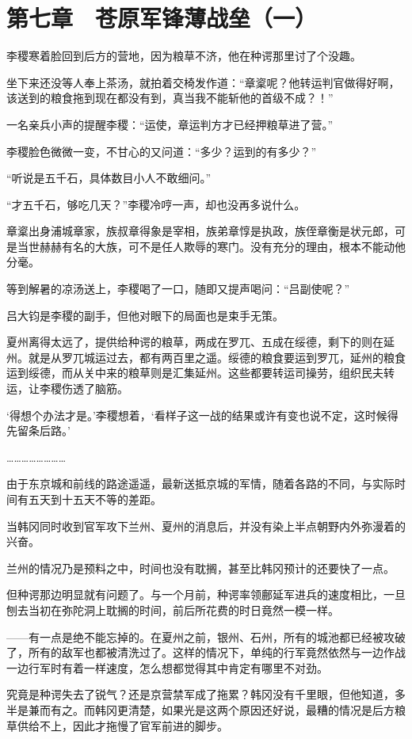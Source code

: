 \section{第七章　苍原军锋薄战垒（一）}

李稷寒着脸回到后方的营地，因为粮草不济，他在种谔那里讨了个没趣。

坐下来还没等人奉上茶汤，就拍着交椅发作道：“章楶呢？他转运判官做得好啊，该送到的粮食拖到现在都没有到，真当我不能斩他的首级不成？！”

一名亲兵小声的提醒李稷：“运使，章运判方才已经押粮草进了营。”

李稷脸色微微一变，不甘心的又问道：“多少？运到的有多少？”

“听说是五千石，具体数目小人不敢细问。”

“才五千石，够吃几天？”李稷冷哼一声，却也没再多说什么。

章楶出身浦城章家，族叔章得象是宰相，族弟章惇是执政，族侄章衡是状元郎，可是当世赫赫有名的大族，可不是任人欺辱的寒门。没有充分的理由，根本不能动他分毫。

等到解暑的凉汤送上，李稷喝了一口，随即又提声喝问：“吕副使呢？”

吕大钧是李稷的副手，但他对眼下的局面也是束手无策。

夏州离得太远了，提供给种谔的粮草，两成在罗兀、五成在绥德，剩下的则在延州。就是从罗兀城运过去，都有两百里之遥。绥德的粮食要运到罗兀，延州的粮食运到绥德，而从关中来的粮草则是汇集延州。这些都要转运司操劳，组织民夫转运，让李稷伤透了脑筋。

‘得想个办法才是。’李稷想着，‘看样子这一战的结果或许有变也说不定，这时候得先留条后路。’

……………………

由于东京城和前线的路途遥遥，最新送抵京城的军情，随着各路的不同，与实际时间有五天到十五天不等的差距。

当韩冈同时收到官军攻下兰州、夏州的消息后，并没有染上半点朝野内外弥漫着的兴奋。

兰州的情况乃是预料之中，时间也没有耽搁，甚至比韩冈预计的还要快了一点。

但种谔那边明显就有问题了。与一个月前，种谔率领鄜延军进兵的速度相比，一旦刨去当初在弥陀洞上耽搁的时间，前后所花费的时日竟然一模一样。

——有一点是绝不能忘掉的。在夏州之前，银州、石州，所有的城池都已经被攻破了，所有的敌军也都被清洗过了。这样的情况下，单纯的行军竟然依然与一边作战一边行军时有着一样速度，怎么想都觉得其中肯定有哪里不对劲。

究竟是种谔失去了锐气？还是京营禁军成了拖累？韩冈没有千里眼，但他知道，多半是兼而有之。而韩冈更清楚，如果光是这两个原因还好说，最糟的情况是后方粮草供给不上，因此才拖慢了官军前进的脚步。

